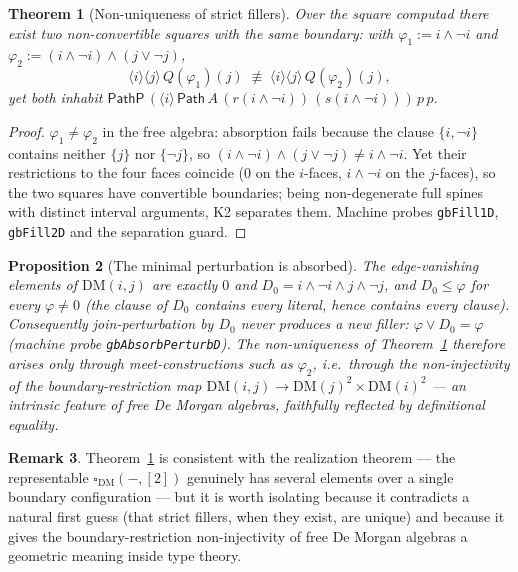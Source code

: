 \documentclass[11pt]{amsart}
\newtheorem{thm}{Theorem}[section]
\newtheorem{prop}[thm]{Proposition}
\theoremstyle{definition}
\newtheorem{rem}[thm]{Remark}
\newcommand{\DM}[1]{\mathrm{DM}(#1)}
\newcommand{\Dbox}{\square_{\mathrm{DM}}}
\newcommand{\nconv}{\not\equiv}
\newcommand{\Path}{\mathsf{Path}}
\newcommand{\PathP}{\mathsf{PathP}}
\begin{document}
\begin{thm}[Non-uniqueness of strict fillers]\label{thm:fillers}
  Over the square computad there exist two non-convertible squares
  with the \emph{same} boundary: with
  $\varphi_1 := i \wedge \neg i$ and
  $\varphi_2 := (i \wedge \neg i) \wedge (j \vee \neg j)$,
  \[
    \langle i \rangle \langle j \rangle\, Q(\varphi_1)(j)
    \;\nconv\;
    \langle i \rangle \langle j \rangle\, Q(\varphi_2)(j),
  \]
  yet both inhabit
  $\PathP\,(\langle i \rangle\,
  \Path\,A\,(r(i \wedge \neg i))\,(s(i \wedge \neg i)))\,p\,p$.
\end{thm}
\begin{proof}
  $\varphi_1 \ne \varphi_2$ in the free algebra: absorption fails
  because the clause $\{i, \neg i\}$ contains neither $\{j\}$ nor
  $\{\neg j\}$, so
  $(i \wedge \neg i) \wedge (j \vee \neg j) \ne i \wedge \neg i$.
  Yet their restrictions to the four faces coincide ($0$ on the
  $i$-faces, $i \wedge \neg i$ on the $j$-faces), so the two
  squares have convertible boundaries; being non-degenerate full
  spines with distinct interval arguments, K2 separates them.
  Machine probes \texttt{gbFill1D}, \texttt{gbFill2D} and the
  separation guard.
\end{proof}

\begin{prop}[The minimal perturbation is absorbed]
  \label{prop:absorbed}
  The edge-vanishing elements of $\DM{i,j}$ are exactly $0$ and
  $D_0 = i \wedge \neg i \wedge j \wedge \neg j$, and $D_0 \le
  \varphi$ for \emph{every} $\varphi \ne 0$ (the clause of $D_0$
  contains every literal, hence contains every clause).
  Consequently join-perturbation by $D_0$ never produces a new
  filler: $\varphi \vee D_0 = \varphi$
  (machine probe \texttt{gbAbsorbPerturbD}).  The non-uniqueness of
  Theorem~\ref{thm:fillers} therefore arises only through
  meet-constructions such as $\varphi_2$, i.e.\ through the
  non-injectivity of the boundary-restriction map
  $\DM{i,j} \to \DM{j}^2 \times \DM{i}^2$ --- an intrinsic feature
  of free De Morgan algebras, faithfully reflected by definitional
  equality.
\end{prop}

\begin{rem}
  Theorem~\ref{thm:fillers} is consistent with the realization
  theorem --- the representable $\Dbox(-,[2])$ genuinely has
  several elements over a single boundary configuration --- but it
  is worth isolating because it contradicts a natural first guess
  (that strict fillers, when they exist, are unique) and because it
  gives the boundary-restriction non-injectivity of free De Morgan
  algebras a geometric meaning inside type theory.
\end{rem}
\end{document}
